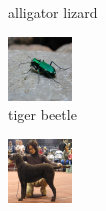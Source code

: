 \documentclass[10pt,twocolumn,letterpaper]{article}
\begin{document}
\begin{figure}
\begin{subfigure}[t]{0.3\linewidth}
        \caption*{alligator lizard}
    \end{subfigure}
    \begin{subfigure}[t]{0.3\linewidth}\centering
        \includegraphics[width=\textwidth]{images/300.png}
        \caption*{tiger beetle}
    \end{subfigure}
    \begin{subfigure}[t]{0.3\linewidth}\centering
    \includegraphics[width=\textwidth]{images/206.png}

\end{subfigure}
\end{figure}
\end{document}
